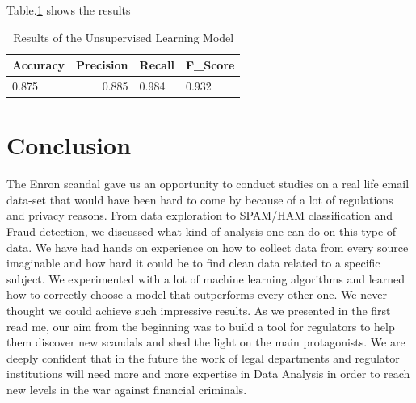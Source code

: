 \documentclass[11pt]{article}
\begin{document}
Table.\ref{tab:unsupervised} shows the results
\begin{table}[htb]
\centering
\begin{tabular}{|l|r|l|l|} 
\hline
Accuracy & Precision & Recall & F\_Score  \\ 
\hline
0.875    & 0.885     & 0.984  & 0.932    \\
\hline
\end{tabular}
 \caption{Results of the Unsupervised Learning Model}
    \label{tab:unsupervised}
\end{table}

\vspace{-8mm}
\section{Conclusion}
The Enron scandal gave us an opportunity to conduct studies on a real life email data-set that would have been hard to come by because of a lot of regulations and privacy reasons.
From data exploration to SPAM/HAM classification and Fraud detection, we discussed what kind of analysis one can do on this type of data. We have had hands on experience on how to collect data from every source imaginable and how hard it could be to find clean data related to a specific subject.
We experimented with a lot of machine learning algorithms and learned how to correctly choose a model that outperforms every other one. We never thought we could achieve such impressive results. As we presented in the first read me, our aim from the beginning was to build a tool for regulators to help them discover new scandals and shed the light on the main protagonists. We are deeply confident that in the future the work of legal departments and regulator institutions will need more and more expertise in Data Analysis in order to reach new levels in the war against financial criminals.


\end{document}
